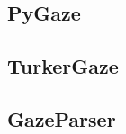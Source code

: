 \documentclass[12pt]{article}
\begin{document}
\subsection{PyGaze}

\subsection{TurkerGaze}

\subsection{GazeParser}




\end{document}
